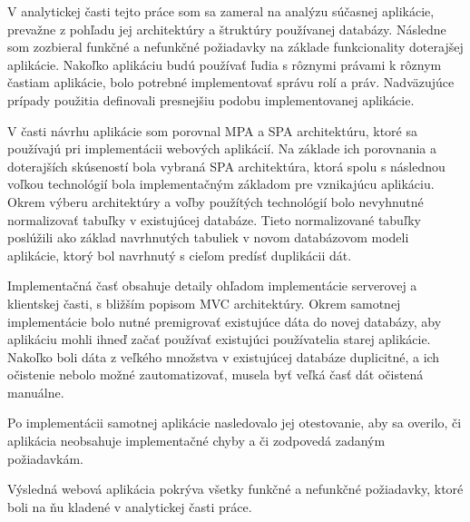 \begin{conclusion}
V analytickej časti tejto práce som sa zameral na analýzu súčasnej aplikácie, prevažne z pohľadu jej architektúry a štruktúry používanej databázy. Následne som zozbieral funkčné a nefunkčné požiadavky na základe funkcionality doterajšej aplikácie. Nakoľko aplikáciu budú používať ľudia s rôznymi právami k rôznym častiam aplikácie, bolo potrebné implementovať správu rolí a práv. Nadväzujúce prípady použitia definovali presnejšiu podobu implementovanej aplikácie.

V časti návrhu aplikácie som porovnal MPA a SPA architektúru, ktoré sa používajú pri implementácii webových aplikácií. Na základe ich porovnania a doterajších skúseností bola vybraná SPA architektúra, ktorá spolu s následnou voľkou technológií bola implementačným základom pre vznikajúcu aplikáciu. Okrem výberu architektúry a voľby použítých technológií bolo nevyhnutné normalizovať tabuľky v existujúcej databáze. Tieto normalizované tabuľky poslúžili ako základ navrhnutých tabuliek v novom databázovom modeli aplikácie, ktorý bol navrhnutý s cieľom predísť duplikácii dát.

Implementačná časť obsahuje detaily ohľadom implementácie serverovej a klientskej časti, s bližším popisom MVC architektúry.
Okrem samotnej implementácie bolo nutné premigrovať existujúce dáta do novej databázy, aby aplikáciu mohli ihneď začať používať existujúci používatelia starej aplikácie. Nakoľko boli dáta z veľkého množstva v existujúcej databáze duplicitné, a ich očistenie nebolo možné zautomatizovať, musela byť veľká časť dát očistená manuálne.

Po implementácii samotnej aplikácie nasledovalo jej otestovanie, aby sa overilo, či aplikácia neobsahuje implementačné chyby a či zodpovedá zadaným požiadavkám.

Výsledná webová aplikácia pokrýva všetky funkčné a nefunkčné požiadavky, ktoré boli na ňu kladené v analytickej časti práce.
\end{conclusion}